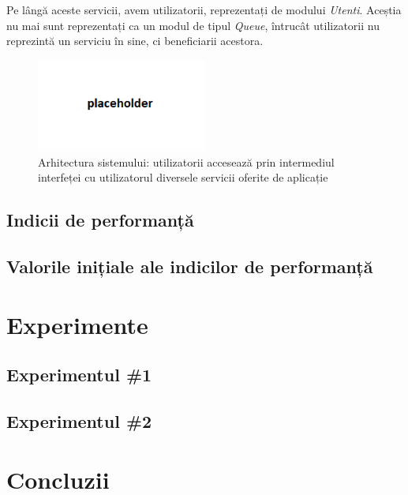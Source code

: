 \documentclass[12pt]{article}
\begin{document}
            Pe lângă aceste servicii, avem utilizatorii, reprezentați de modului \textit{Utenti}. Aceștia nu mai sunt reprezentați ca un modul de tipul \textit{Queue}, întrucât utilizatorii nu reprezintă un serviciu în sine, ci beneficiarii acestora.

            \begin{figure}[h!]
                \centering
                \includegraphics[width=0.5\textwidth]{images/architecture.png}
                \caption{Arhitectura sistemului: utilizatorii accesează prin intermediul interfeței cu utilizatorul diversele servicii oferite de aplicație}
            \end{figure}
            \pagebreak

        \subsection{Indicii de performanță}
            \lipsum[1-2]

        \subsection{Valorile inițiale ale indicilor de performanță}
            \lipsum[1-2]


    \section{Experimente}

        \subsection{Experimentul \#1}
            \lipsum[1-2]
        
        \subsection{Experimentul \#2}
            \lipsum[1-2]

    \section{Concluzii}
        \lipsum[1-2]
\end{document}
